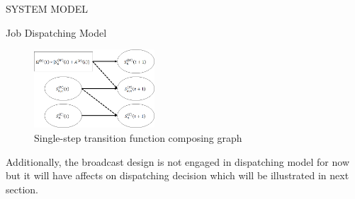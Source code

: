 \documentclass[10pt, conference, letterpaper]{IEEEtran}
\begin{document}
\begin{section}{SYSTEM MODEL}
\begin{subsection}{Job Dispatching Model}
            \begin{figure}[ht]
                \centering
                \includegraphics[width=0.40\textwidth]{single-transition.png}
                \caption{Single-step transition function composing graph}
                \label{fig:trans}
            \end{figure}

            Additionally, the broadcast design is not engaged in dispatching model for now but it will have affects on dispatching decision which will be illustrated in next section.
        \end{subsection}
    \end{section}
\end{document}
